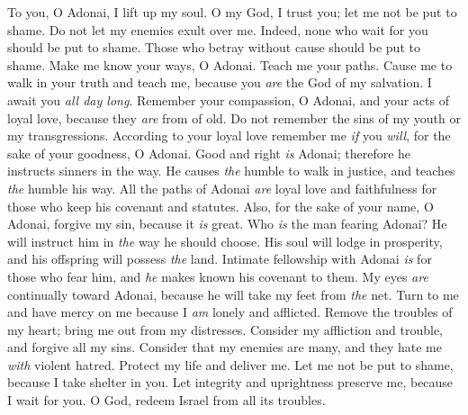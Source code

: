 \begin{biblechapter} %
 To you, O Adonai, I lift up my soul.
\verse O my God, I trust you; let me not be put to shame. 
Do not let my enemies exult over me.
\verse Indeed, none who wait for you should be put to shame. 
Those who betray without cause should be put to shame.
\verse Make me know your ways, O Adonai. 
Teach me your paths.
\verse Cause me to walk in your truth and teach me, 
because you \textit{are} the God of my salvation. 
I await you \textit{all day long}.
\verse Remember your compassion, O Adonai, 
and your acts of loyal love, 
because they \textit{are} from of old.
\verse Do not remember 
the sins of my youth or my transgressions. 
According to your loyal love remember me \textit{if} you \textit{will}, 
for the sake of your goodness, O Adonai.
\verse Good and right \textit{is} Adonai; 
therefore he instructs sinners in the way.
\verse He causes \textit{the} humble to walk in justice, 
and teaches \textit{the} humble his way.
\verse All the paths of Adonai \textit{are} loyal love and faithfulness 
for those who keep his covenant and statutes.
\verse Also, for the sake of your name, O Adonai, 
forgive my sin, because it \textit{is} great.
\verse Who \textit{is} the man fearing Adonai? 
He will instruct him in \textit{the} way he should choose.
\verse His soul will lodge in prosperity, 
and his offspring will possess \textit{the} land.
\verse Intimate fellowship with Adonai \textit{is} for those who fear him, 
and \textit{he} makes known his covenant to them.
\verse My eyes \textit{are} continually toward Adonai, 
because he will take my feet from \textit{the} net.
\verse Turn to me and have mercy on me 
because I \textit{am} lonely and afflicted.
\verse Remove the troubles of my heart; 
bring me out from my distresses.
\verse Consider my affliction and trouble, 
and forgive all my sins.
\verse Consider that my enemies are many, 
and they hate me \textit{with} violent hatred.
\verse Protect my life and deliver me. 
Let me not be put to shame, because I take shelter in you.
\verse Let integrity and uprightness preserve me, 
because I wait for you.
\verse O God, redeem Israel 
from all its troubles.
\end{biblechapter}

